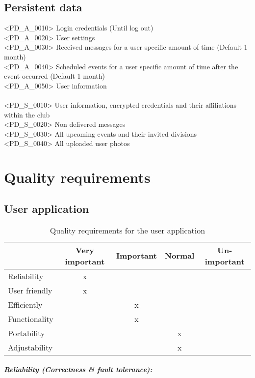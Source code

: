 \section{Persistent data}
<PD\_A\_0010> Login credentials (Until log out) \\
<PD\_A\_0020> User settings \\
<PD\_A\_0030> Received messages for a user specific amount of time (Default 1 month) \\
<PD\_A\_0040> Scheduled events for a user specific amount of time after the event occurred (Default 1 month) \\
<PD\_A\_0050> User information \\
\\
<PD\_S\_0010> User information, encrypted credentials and their affiliations within the club \\
<PD\_S\_0020> Non delivered messages \\
<PD\_S\_0030> All upcoming events and their invited divisions \\
<PD\_S\_0040> All uploaded user photos \\

\chapter{Quality requirements}
\section{User application}

\begin{table}[h]
  \begin{tabular}{| l || c | c | c | c |}
      \hline
      & Very important & Important & Normal & Un-important \\ \hline \hline
      Reliability & x & & & \\ \hline
      User friendly & x & & & \\ \hline
      Efficiently & & x & & \\ \hline
      Functionality & & x & & \\ \hline
      Portability & & & x &  \\ \hline
      Adjustability & & & x &  \\ \hline
  \end{tabular}
  \caption{Quality requirements for the user application}
\end{table}

\paragraph{Reliability (Correctness \& fault tolerance):}


